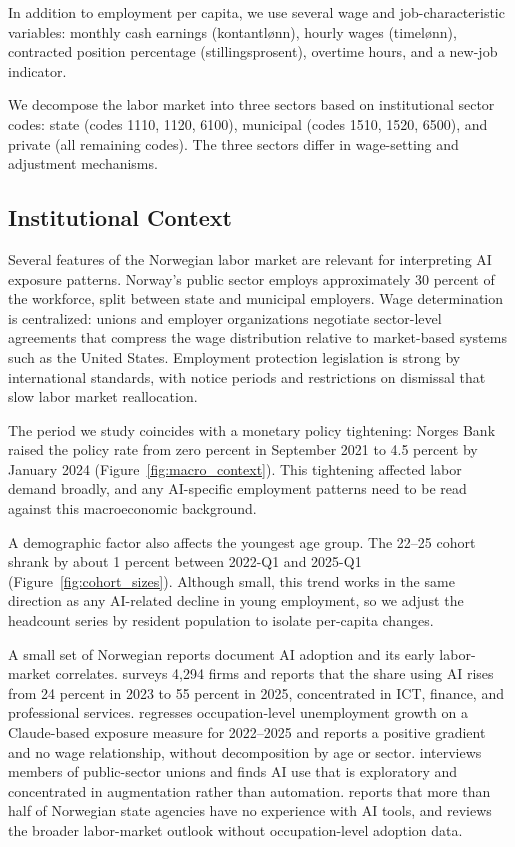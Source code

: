 In addition to employment per capita, we use several wage and job-characteristic variables: monthly cash earnings (kontantl{\o}nn), hourly wages (timel{\o}nn), contracted position percentage (stillingsprosent), overtime hours, and a new-job indicator.

We decompose the labor market into three sectors based on institutional sector codes: state (codes 1110, 1120, 6100), municipal (codes 1510, 1520, 6500), and private (all remaining codes). The three sectors differ in wage-setting and adjustment mechanisms.


\subsection{Institutional Context}\label{sec:data:institutions}

Several features of the Norwegian labor market are relevant for interpreting AI exposure patterns. Norway's public sector employs approximately 30 percent of the workforce, split between state and municipal employers. Wage determination is centralized: unions and employer organizations negotiate sector-level agreements that compress the wage distribution relative to market-based systems such as the United States. Employment protection legislation is strong by international standards, with notice periods and restrictions on dismissal that slow labor market reallocation.

The period we study coincides with a monetary policy tightening: Norges Bank raised the policy rate from zero percent in September 2021 to 4.5 percent by January 2024 (Figure~\ref{fig:macro_context}). This tightening affected labor demand broadly, and any AI-specific employment patterns need to be read against this macroeconomic background.

A demographic factor also affects the youngest age group. The 22--25 cohort shrank by about 1 percent between 2022-Q1 and 2025-Q1 (Figure~\ref{fig:cohort_sizes}). Although small, this trend works in the same direction as any AI-related decline in young employment, so we adjust the headcount series by resident population to isolate per-capita changes.

A small set of Norwegian reports document AI adoption and its early labor-market correlates. \citet{samfunnsok2026} surveys 4{,}294 firms and reports that the share using AI rises from 24 percent in 2023 to 55 percent in 2025, concentrated in ICT, finance, and professional services. \citet{menon2026} regresses occupation-level unemployment growth on a Claude-based exposure measure for 2022--2025 and reports a positive gradient and no wage relationship, without decomposition by age or sector. \citet{nifu2024} interviews members of public-sector unions and finds AI use that is exploratory and concentrated in augmentation rather than automation. \citet{riksrevisjonen2024} reports that more than half of Norwegian state agencies have no experience with AI tools, and \citet{nav2025} reviews the broader labor-market outlook without occupation-level adoption data.



